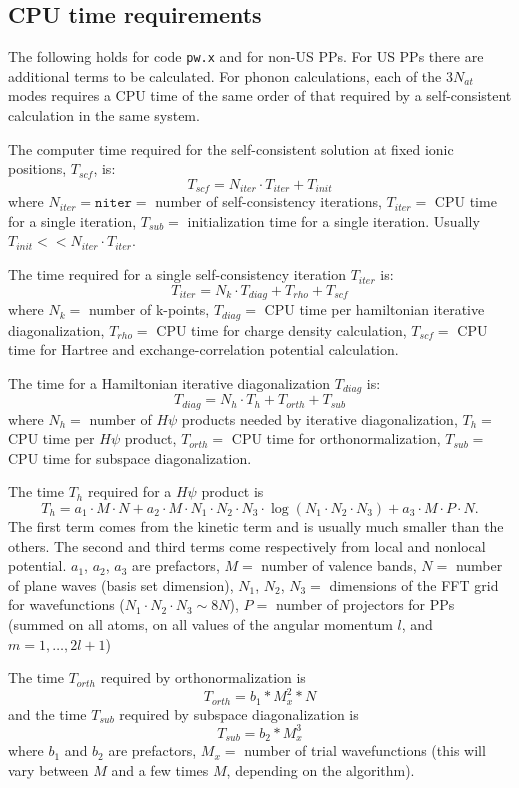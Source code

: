 \documentclass[12pt,a4paper]{article}
\begin{document}
\subsection{CPU time requirements}

The following holds for code {\tt pw.x} and for non-US PPs. 
For US PPs there are additional terms to be calculated.
For phonon calculations, each of the $3 N_{at}$ modes requires a CPU
time of the same order of that required by a self-consistent 
calculation in the same system.

The computer time required for the self-consistent solution at fixed
ionic positions, $T_{scf}$, is:
$$
T_{scf} = N_{iter} \cdot T_{iter} + T_{init}
$$
where $N_{iter}=\mathtt{niter}=$ number of self-consistency
iterations, $T_{iter}=$ CPU time for a single iteration,
$T_{sub}=$ initialization time for a single iteration. 
Usually $T_{init} << N_{iter} \cdot T_{iter}$.

The time required for a single self-consistency iteration
$T_{iter}$ is:
$$
T_{iter} = N_k \cdot T_{diag} + T_{rho} + T_{scf}
$$
where $N_k=$ number of k-points, $T_{diag}=$ CPU time per hamiltonian
iterative diagonalization, $T_{rho}=$ CPU time for charge density
calculation, $T_{scf}=$ CPU time for Hartree and exchange-correlation
potential calculation.

The time for a Hamiltonian iterative diagonalization $T_{diag}$ is:
$$
T_{diag} = N_h \cdot T_h + T_{orth} + T_{sub}
$$
where $N_h=$ number of $H\psi$ products needed by iterative
diagonalization, $T_h=$ CPU time per $H\psi$ product, $T_{orth}=$ CPU
time for orthonormalization, $T_{sub}=$ CPU time for subspace
diagonalization.

The time $T_h$ required for a $H\psi$ product is
$$
T_h = a_1 \cdot M \cdot N
      + a_2 \cdot M \cdot N_1 \cdot N_2 \cdot N_3 \cdot
        \log(N_1 \cdot N_2 \cdot N_3)
      + a_3 \cdot M \cdot P \cdot N.
$$
The first term comes from the kinetic term and is usually much smaller
than the others.
The second and third terms come respectively from local and nonlocal
potential.
$a_1$, $a_2$, $a_3$ are prefactors, $M=$ number of valence bands,
$N=$ number of plane waves (basis set dimension), 
$N_1$, $N_2$, $N_3=$ dimensions of the FFT grid for wavefunctions
($N_1 \cdot N_2 \cdot N_3 \sim 8N$), $P=$ number of projectors for PPs
(summed on all atoms, on all values of the angular momentum $l$, and
$m=1,\dots,2l+1$)

The time $T_{orth}$ required by orthonormalization is
$$
      T_{orth}=b_1*M_x^2*N
$$
and the time $T_{sub}$ required by subspace diagonalization is
$$
   T_{sub}=b_2*M_x^3
$$
where $b_1$ and $b_2$ are prefactors, $M_x=$ number of trial
wavefunctions (this will vary between $M$ and a few times $M$,
depending on the algorithm).
\end{document}
